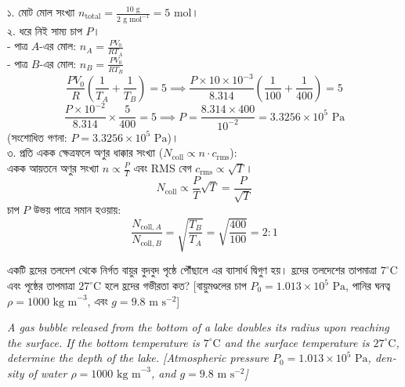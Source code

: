 \documentclass[12pt, a4paper]{article}
\begin{document}
{%
\begin{tcolorbox}[solutionbox={সমাধান (Solution)}]
\noindent
১. মোট মোল সংখ্যা $n_{\text{total}} = \frac{10\text{ g}}{2\text{ g mol}^{-1}} = 5\text{ mol}$। \\
২. ধরে নিই সাম্য চাপ $P$। \\
- পাত্র $A$-এর মোল: $n_A = \frac{P V_0}{R T_A}$ \\
- পাত্র $B$-এর মোল: $n_B = \frac{P V_0}{R T_B}$
\[ \frac{P V_0}{R} \left(\frac{1}{T_A} + \frac{1}{T_B}\right) = 5 \implies \frac{P \times 10 \times 10^{-3}}{8.314} \left(\frac{1}{100} + \frac{1}{400}\right) = 5 \]
\[ \frac{P \times 10^{-2}}{8.314} \times \frac{5}{400} = 5 \implies P = \frac{8.314 \times 400}{10^{-2}} = 3.3256 \times 10^5\text{ Pa} \]
(সংশোধিত গণনা: $P = 3.3256 \times 10^5\text{ Pa}$)। \\
৩. প্রতি একক ক্ষেত্রফলে অণুর ধাক্কার সংখ্যা ($N_{\text{coll}} \propto n \cdot c_{\text{rms}}$): \\
একক আয়তনে অণুর সংখ্যা $n \propto \frac{P}{T}$ এবং RMS বেগ $c_{\text{rms}} \propto \sqrt{T}$।
\[ N_{\text{coll}} \propto \frac{P}{T} \sqrt{T} = \frac{P}{\sqrt{T}} \]
চাপ $P$ উভয় পাত্রে সমান হওয়ায়:
\[ \frac{N_{\text{coll}, A}}{N_{\text{coll}, B}} = \sqrt{\frac{T_B}{T_A}} = \sqrt{\frac{400}{100}} = 2 : 1 \]
\end{tcolorbox}

\begin{tcolorbox}[questionbox={প্রশ্ন (Question) 10}]
\noindent
একটি হ্রদের তলদেশ থেকে নির্গত বায়ুর বুদবুদ পৃষ্ঠে পৌঁছালে এর ব্যাসার্ধ দ্বিগুণ হয়। হ্রদের তলদেশের তাপমাত্রা $7^\circ\text{C}$ এবং পৃষ্ঠের তাপমাত্রা $27^\circ\text{C}$ হলে হ্রদের গভীরতা কত? [বায়ুমণ্ডলের চাপ $P_0 = 1.013 \times 10^5\text{ Pa}$, পানির ঘনত্ব $\rho = 1000\text{ kg m}^{-3}$, এবং $g = 9.8\text{ m s}^{-2}$]

\vspace{0.8em}
\begin{english}
\noindent\textit{\color{darkgray}
A gas bubble released from the bottom of a lake doubles its radius upon reaching the surface. If the bottom temperature is $7^\circ\text{C}$ and the surface temperature is $27^\circ\text{C}$, determine the depth of the lake. [Atmospheric pressure $P_0 = 1.013 \times 10^5\text{ Pa}$, density of water $\rho = 1000\text{ kg m}^{-3}$, and $g = 9.8\text{ m s}^{-2}$]
}
\end{english}
\end{tcolorbox}

}
\end{document}
